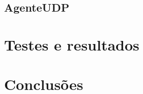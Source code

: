 \documentclass{llncs}
\begin{document}
\subsection{AgenteUDP}






\section{Testes e resultados}



\section{Conclusões}
\end{document}
